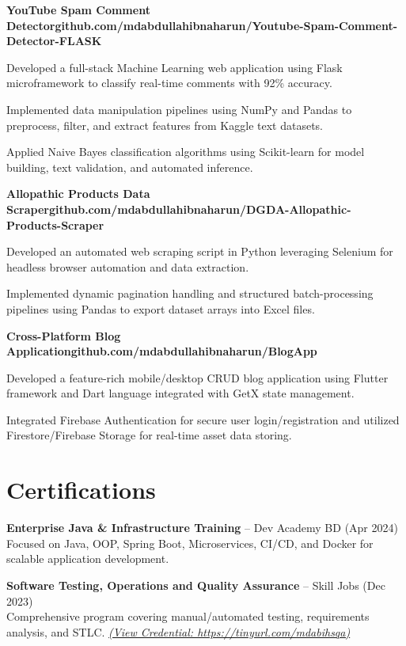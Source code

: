 \documentclass[letterpaper,10pt]{article}
\newcommand{\heading}[2]{\hspace{10pt}#1\hfill#2\\}
\newcommand{\headingBf}[2]{\heading{\textbf{#1}}{\textbf{#2}}}
\newenvironment{resume_list}{
  \vspace{-7pt}
  \begin{itemize}[itemsep=-2px, parsep=1pt, leftmargin=30pt]
}{
  \end{itemize}
}
\begin{document}
\headingBf{YouTube Spam Comment Detector}{github.com/mdabdullahibnaharun/Youtube-Spam-Comment-Detector-FLASK}
\begin{resume_list}
  \item Developed a full-stack Machine Learning web application using Flask microframework to classify real-time comments with 92\% accuracy.
  \item Implemented data manipulation pipelines using NumPy and Pandas to preprocess, filter, and extract features from Kaggle text datasets.
  \item Applied Naive Bayes classification algorithms using Scikit-learn for model building, text validation, and automated inference.
\end{resume_list}

\headingBf{Allopathic Products Data Scraper}{github.com/mdabdullahibnaharun/DGDA-Allopathic-Products-Scraper}
\begin{resume_list}
  \item Developed an automated web scraping script in Python leveraging Selenium for headless browser automation and data extraction.
  \item Implemented dynamic pagination handling and structured batch-processing pipelines using Pandas to export dataset arrays into Excel files.
\end{resume_list}

\headingBf{Cross-Platform Blog Application}{github.com/mdabdullahibnaharun/BlogApp}
\begin{resume_list}
  \item Developed a feature-rich mobile/desktop CRUD blog application using Flutter framework and Dart language integrated with GetX state management.
  \item Integrated Firebase Authentication for secure user login/registration and utilized Firestore/Firebase Storage for real-time asset data storing.
\end{resume_list}

\section{Certifications}
\begin{resume_list}
  \item \textbf{Enterprise Java \& Infrastructure Training} -- Dev Academy BD (Apr 2024) \\
  Focused on Java, OOP, Spring Boot, Microservices, CI/CD, and Docker for scalable application development.
  \item \textbf{Software Testing, Operations and Quality Assurance} -- Skill Jobs (Dec 2023) \\
  Comprehensive program covering manual/automated testing, requirements analysis, and STLC. \href{https://tinyurl.com/mdabihsqa}{\textit{(View Credential: https://tinyurl.com/mdabihsqa)}}
\end{resume_list}
\end{document}
